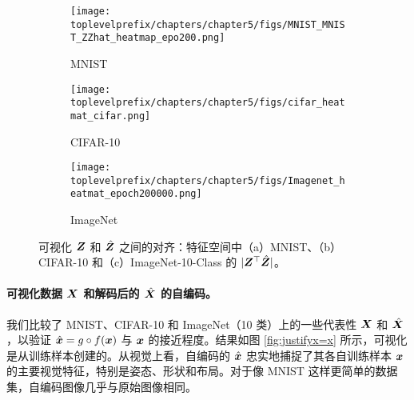 \documentclass[../../book-main.tex]{subfiles}
\begin{document}
\begin{figure}[t]
    \begin{subfigure}[t]{0.3\textwidth}
        \centering
        \texttt{[image: \\toplevelprefix/chapters/chapter5/figs/MNIST\_MNIST\_ZZhat\_heatmap\_epo200.png]}
        \caption{MNIST}
    \end{subfigure}
    \hfill
    \begin{subfigure}[t]{0.3\textwidth}
        \centering
        \texttt{[image: \\toplevelprefix/chapters/chapter5/figs/cifar\_heatmat\_cifar.png]}
        \caption{CIFAR-10}
    \end{subfigure}
    \hfill
    \begin{subfigure}[t]{0.3\textwidth}
        \centering
        \texttt{[image: \\toplevelprefix/chapters/chapter5/figs/Imagenet\_heatmat\_epoch200000.png]}
        \caption{ImageNet}
    \end{subfigure}
    \caption{可视化 $\bm{Z}$ 和 $\hat{\bm{Z}}$ 之间的对齐：特征空间中（a）MNIST、（b）CIFAR-10 和（c）ImageNet-10-Class 的 $|\bm{Z}^\top \hat{\bm{Z}}|$。}
    \label{fig:justifyz=z}
\end{figure}
 





\paragraph{可视化数据 $\bm{X}$ 和解码后的 $\hat {\bm{X}}$ 的自编码。} 我们比较了 MNIST、CIFAR-10 和 ImageNet（10 类）上的一些代表性 $\bm{X}$ 和 $\hat{\bm{X}}$，以验证 $\hat {\bm{x}} = g\circ f(\bm{x})$ 与 $\bm{x}$ 的接近程度。结果如图 \ref{fig:justifyx=x} 所示，可视化是从训练样本创建的。从视觉上看，自编码的 $\hat {\bm{x}}$ 忠实地捕捉了其各自训练样本 $\bm{x}$ 的主要视觉特征，特别是姿态、形状和布局。对于像 MNIST 这样更简单的数据集，自编码图像几乎与原始图像相同。
\end{document}
